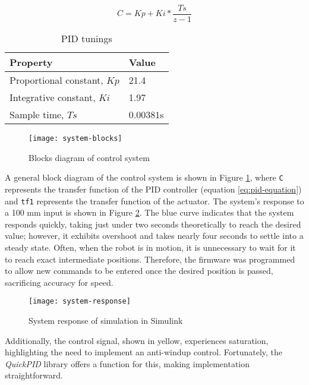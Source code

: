 \begin{equation}
    \label{eq:pid-equation}
    C = Kp + Ki * \frac{Ts}{z-1}
\end{equation}

\begin{table}[h]
    \centering
    \caption{PID tunings}
    \label{tab:pid-tunings}
    \begin{tabular}{ll}
    \toprule
    Property & Value \\
    \midrule
    Proportional constant, $Kp$  & 21.4 \\
    Integrative constant, $Ki$ & 1.97 \\
    Sample time, $Ts$ & $0.00381$s \\
    \bottomrule
    \end{tabular}
\end{table}

\begin{figure}[H]
    \centering
    \texttt{[image: system-blocks]}
    \caption{Blocks diagram of control system}
    \label{fig:system-blocks}
\end{figure}

A general block diagram of the control system is shown in Figure \ref{fig:system-blocks}, where \texttt{C} represents the transfer function of the PID controller (equation \ref{eq:pid-equation}) and \texttt{tf1} represents the transfer function of the actuator. The system's response to a 100 mm input is shown in Figure \ref{fig:system-response}. The blue curve indicates that the system responds quickly, taking just under two seconds theoretically to reach the desired value; however, it exhibits overshoot and takes nearly four seconds to settle into a steady state. Often, when the robot is in motion, it is unnecessary to wait for it to reach exact intermediate positions. Therefore, the firmware was programmed to allow new commands to be entered once the desired position is passed, sacrificing accuracy for speed.

\begin{figure}[H]
    \centering
    \texttt{[image: system-response]}
    \caption{System response of simulation in Simulink}
    \label{fig:system-response}
\end{figure}

Additionally, the control signal, shown in yellow, experiences saturation, highlighting the need to implement an anti-windup control. Fortunately, the \textit{QuickPID} library offers a function for this, making implementation straightforward.
